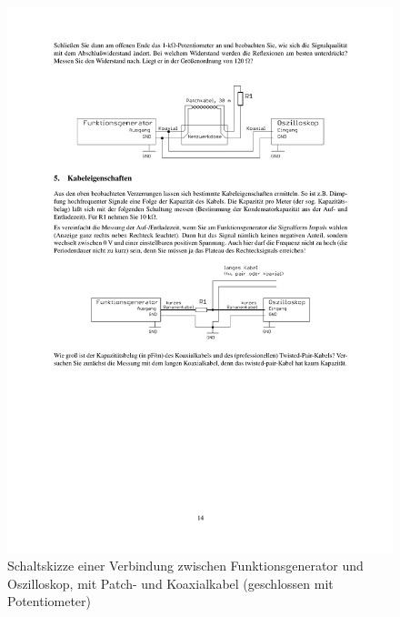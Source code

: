 \documentclass[12pt,a4paper]{article}
\begin{document}
\begin{figure}[H] 
  \centering
    \includegraphics[trim = 10mm 210mm 10mm 40mm, clip, scale = 1]{4-5.pdf}
  	\caption[Schaltskizze einer Verbindung zwischen Funktionsgenerator und Oszilloskop, mit Patch- und Koaxialkabel (geschlossen mit Potentiometer)]{Schaltskizze einer Verbindung zwischen Funktionsgenerator und Oszilloskop, mit Patch- und Koaxialkabel (geschlossen mit Potentiometer)\footnotemark}
  \label{fig:4.2}
\end{figure}
\end{document}
